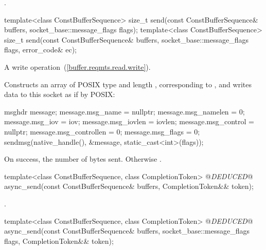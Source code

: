 \begin{itemdescr}
\pnum
\returns {}.
\end{itemdescr}

\begin{itemdecl}
template<class ConstBufferSequence>
  size_t send(const ConstBufferSequence& buffers,
              socket_base::message_flags flags);
template<class ConstBufferSequence>
  size_t send(const ConstBufferSequence& buffers,
              socket_base::message_flags flags, error_code& ec);
\end{itemdecl}

\begin{itemdescr}
\pnum
A write operation~(\ref{buffer.reqmts.read.write}).

\pnum
\effects Constructs an array  of POSIX type  and length , corresponding to , and writes data to this socket as if by POSIX: 
\begin{codeblock}
msghdr message;
message.msg_name = nullptr;
message.msg_namelen = 0;
message.msg_iov = iov;
message.msg_iovlen = iovlen;
message.msg_control = nullptr;
message.msg_controllen = 0;
message.msg_flags = 0;
sendmsg(native_handle(), &message, static_cast<int>(flags));
\end{codeblock}


\pnum
\returns On success, the number of bytes sent. Otherwise .
\end{itemdescr}

\begin{itemdecl}
template<class ConstBufferSequence, class CompletionToken>
  @\textit{DEDUCED}@ async_send(const ConstBufferSequence& buffers, CompletionToken&& token);
\end{itemdecl}

\begin{itemdescr}
\pnum
\returns {}.
\end{itemdescr}

\begin{itemdecl}
template<class ConstBufferSequence, class CompletionToken>
  @\textit{DEDUCED}@ async_send(const ConstBufferSequence& buffers,
                     socket_base::message_flags flags,
                     CompletionToken&& token);
\end{itemdecl}

